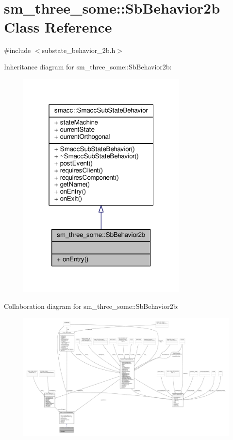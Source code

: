 \hypertarget{classsm__three__some_1_1SbBehavior2b}{}\section{sm\+\_\+three\+\_\+some\+:\+:Sb\+Behavior2b Class Reference}
\label{classsm__three__some_1_1SbBehavior2b}


{\ttfamily \#include $<$substate\+\_\+behavior\+\_\+2b.\+h$>$}



Inheritance diagram for sm\+\_\+three\+\_\+some\+:\+:Sb\+Behavior2b\+:
\nopagebreak
\begin{figure}[H]
\begin{center}
\leavevmode
\includegraphics[width=241pt]{classsm__three__some_1_1SbBehavior2b__inherit__graph}
\end{center}
\end{figure}


Collaboration diagram for sm\+\_\+three\+\_\+some\+:\+:Sb\+Behavior2b\+:
\nopagebreak
\begin{figure}[H]
\begin{center}
\leavevmode
\includegraphics[width=350pt]{classsm__three__some_1_1SbBehavior2b__coll__graph}
\end{center}
\end{figure}
